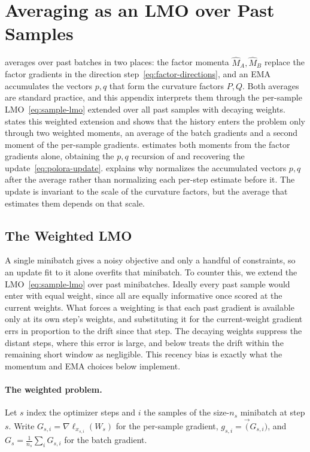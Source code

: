
\section{Averaging as an LMO over Past Samples}
\label{app:matnormal}
 averages over past batches in two places: the factor
momenta $\widehat M_A,\widehat M_B$ replace the factor gradients in the
direction step~\eqref{eq:factor-directions}, and an EMA accumulates the
vectors $p,q$ that form the curvature factors $P,Q$. Both averages are
standard practice, and this appendix interprets them through the
per-sample LMO~\eqref{eq:sample-lmo} extended over all past samples
with decaying weights.
 states this weighted extension and shows that
the history enters the problem only through two
weighted moments, an average of the batch gradients and a second moment
of the per-sample gradients.
 estimates
both moments from the factor gradients alone, obtaining the $p,q$
recursion of  and recovering the
update~\eqref{eq:polora-update}.  explains
why  normalizes the accumulated vectors $p,q$ after the
average rather than normalizing each per-step estimate before it. The
update is invariant to the scale of the curvature factors, but the
average that estimates them depends on that scale.


\subsection{The Weighted LMO}
\label{sec:weighted-lmo}
A single minibatch gives a noisy objective and only a handful of
constraints, so an update fit to it alone overfits that minibatch. To
counter this, we extend the LMO~\eqref{eq:sample-lmo} over past
minibatches. Ideally every past sample would enter with equal weight,
since all are equally informative once scored at the current weights.
What forces a weighting is that each past gradient is available only
at its own step's weights, and substituting it for the current-weight
gradient errs in proportion to the drift since that step. The decaying
weights suppress the distant steps, where this error is large, and
 below treats the drift within the remaining short
window as negligible. This recency bias is exactly what the momentum
and EMA choices below implement.

\paragraph{The weighted problem.} Let $s$ index the optimizer steps and
$i$ the samples of the size-$n_s$ minibatch at step $s$. Write
$G_{s,i}=\nabla\ell_{x_{s,i}}(W_s)$ for the per-sample gradient, $g_{s,i}=\vec(G_{s,i})$, and
$G_s=\frac1{n_s}\sum_iG_{s,i}$ for the  batch gradient.

